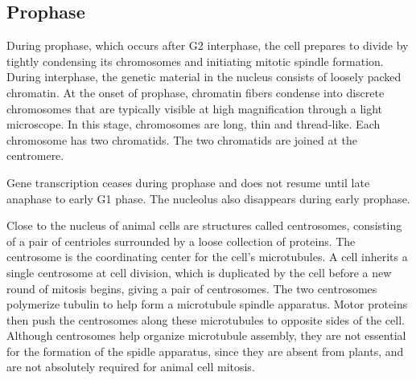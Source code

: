 \hypertarget{prophase}{%
\subsection{Prophase}\label{prophase}}

During prophase, which occurs after G2 interphase, the cell prepares to divide by tightly condensing its chromosomes and initiating mitotic spindle formation. During interphase, the genetic material in the nucleus consists of loosely packed chromatin. At the onset of prophase, chromatin fibers condense into discrete chromosomes that are typically visible at high magnification through a light microscope. In this stage, chromosomes are long, thin and thread-like. Each chromosome has two chromatids. The two chromatids are joined at the centromere.

Gene transcription ceases during prophase and does not resume until late anaphase to early G1 phase. The nucleolus also disappears during early prophase.

Close to the nucleus of animal cells are structures called centrosomes, consisting of a pair of centrioles surrounded by a loose collection of proteins. The centrosome is the coordinating center for the cell's microtubules. A cell inherits a single centrosome at cell division, which is duplicated by the cell before a new round of mitosis begins, giving a pair of centrosomes. The two centrosomes polymerize tubulin to help form a microtubule spindle apparatus. Motor proteins then push the centrosomes along these microtubules to opposite sides of the cell. Although centrosomes help organize microtubule assembly, they are not essential for the formation of the spidle apparatus, since they are absent from plants, and are not absolutely required for animal cell mitosis.



